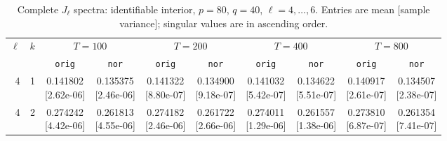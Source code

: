 \documentclass[12pt,letterpaper]{article}
\def\spacingset#1{\renewcommand{\baselinestretch}{#1}\small\normalsize}
\theoremstyle{plain}
\theoremstyle{definition}
\begin{document}
\clearpage
\begin{table}[p]
\begingroup
\spacingset{1.0}
\small\centering
\caption{Complete $J_\ell$ spectra: identifiable interior, $p=80$, $q=40$, $\ell=4,\ldots,6$. Entries are mean [sample variance]; singular values are in ascending order.}
\label{s23:lambda:alltab:spectra:p80q40interior:4-6}
\footnotesize
\setlength{\tabcolsep}{2.2pt}
\renewcommand{\arraystretch}{1.03}
\begin{adjustbox}{max width=\linewidth}
\begin{tabular}{@{}rr*{8}{c}@{}}
\toprule
$\ell$ & $k$ & \multicolumn{2}{c}{$T=100$} & \multicolumn{2}{c}{$T=200$} & \multicolumn{2}{c}{$T=400$} & \multicolumn{2}{c}{$T=800$}\\
\cmidrule(lr){3-4}\cmidrule(lr){5-6}\cmidrule(lr){7-8}\cmidrule(lr){9-10}
 &  & \texttt{orig} & \texttt{nor} & \texttt{orig} & \texttt{nor} & \texttt{orig} & \texttt{nor} & \texttt{orig} & \texttt{nor}\\
\midrule
4 & 1 & \shortstack{0.141802\\[-1pt]{\scriptsize[2.62e-06]}} & \shortstack{0.135375\\[-1pt]{\scriptsize[2.46e-06]}} & \shortstack{0.141322\\[-1pt]{\scriptsize[8.80e-07]}} & \shortstack{0.134900\\[-1pt]{\scriptsize[9.18e-07]}} & \shortstack{0.141032\\[-1pt]{\scriptsize[5.42e-07]}} & \shortstack{0.134622\\[-1pt]{\scriptsize[5.51e-07]}} & \shortstack{0.140917\\[-1pt]{\scriptsize[2.61e-07]}} & \shortstack{0.134507\\[-1pt]{\scriptsize[2.38e-07]}}\\
4 & 2 & \shortstack{0.274242\\[-1pt]{\scriptsize[4.42e-06]}} & \shortstack{0.261813\\[-1pt]{\scriptsize[4.55e-06]}} & \shortstack{0.274182\\[-1pt]{\scriptsize[2.46e-06]}} & \shortstack{0.261722\\[-1pt]{\scriptsize[2.66e-06]}} & \shortstack{0.274011\\[-1pt]{\scriptsize[1.29e-06]}} & \shortstack{0.261557\\[-1pt]{\scriptsize[1.38e-06]}} & \shortstack{0.273810\\[-1pt]{\scriptsize[6.87e-07]}} & \shortstack{0.261354\\[-1pt]{\scriptsize[7.41e-07]}}\\

\end{tabular}
\end{adjustbox}
\end{table}
\end{document}
